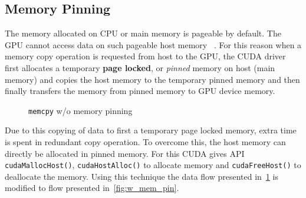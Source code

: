 \subsection{Memory Pinning}\label{memory_pinning}
The memory allocated on CPU or main memory is pageable by default. The GPU cannot
access data on such pageable host memory~\cite{datatransferoptimization}
\cite{programmingguidecuda}. For this reason when a memory copy operation is requested
from host to the GPU, the CUDA driver first allocates a temporary \textbf{page locked},
or \textit{pinned} memory on host (main memory) and copies the host memory to the
temporary pinned memory and then finally transfers the memory from pinned memory
to GPU device memory.
\begin{figure}[h] %
  \caption{\texttt{memcpy} w/o memory pinning}\label{fig:wo_mem_pin}
\end{figure}

Due to this copying of data to first a temporary page locked memory, extra time
is spent in redundant copy operation. To overcome this, the host memory can directly
be allocated in pinned memory. For this CUDA gives API \texttt{cudaMallocHost()},
\texttt{cudaHostAlloc()} to allocate memory and \texttt{cudaFreeHost()} to deallocate
the memory. Using this technique the data flow presented in~\ref{fig:wo_mem_pin} is
modified to flow presented in~\ref{fig:w_mem_pin}.

